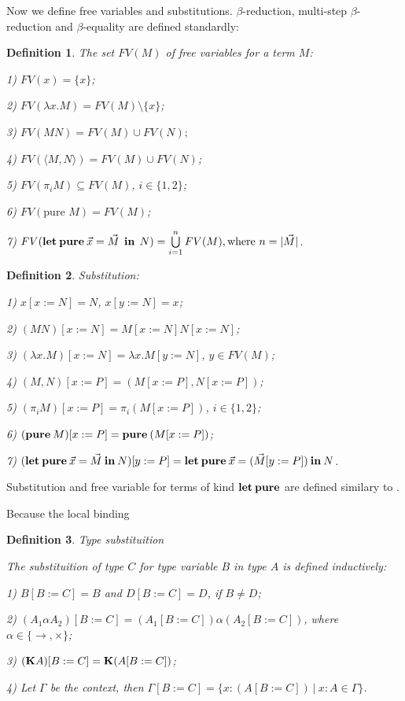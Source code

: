 \documentclass[a4paper]{article}
\newtheorem{defin}{Definition}
\begin{document}
  \vspace{\baselineskip}

  Now we define free variables and substitutions. $\beta$-reduction, multi-step $\beta$-reduction and $\beta$-equality are defined standardly:

  \begin{defin} The set $FV(M)$ of free variables for a term $M$:

  1) $FV(x) = \{ x \}$;

  2) $FV(\lambda x. M) = FV(M) \setminus \{ x\}$;

  3) $FV(M N) = FV(M) \cup FV(N);$

  4) $FV(\langle M,N \rangle) = FV(M) \cup FV(N)$;

  5) $FV(\pi_i M) \subseteq FV(M)$, $i \in \{ 1, 2\}$;

  6) $FV(\text{pure } M) = FV(M)$;

  7) $FV({\bf let \: pure} \: \vec{x} = \vec{M} \:\: {\bf in} \:\: N) = \bigcup \limits_{i = 1}^n FV(M), \text{where $n = |\vec{M}|$}$.
  \end{defin}

  \begin{defin} Substitution:

  1) $x [x := N] = N$, $x [y := N] = x$;

  2) $(M N) [x := N] = M[x := N] N [x := N]$;

  3) $(\lambda x. M) [x := N] = \lambda x. M [y := N]$, $y \in FV(M)$;

  4) $(M, N)[x := P] = (M[x := P], N [x := P])$;

  5) $(\pi_i M) [x := P] = \pi_i (M[x := P])$, $i \in \{ 1, 2\}$;

  6) $({\bf pure \: } M) [x := P] = {\bf pure \: } (M [x := P])$;

  7) $({\bf let \: pure \:}\vec{x} = \vec{M} {\: \bf in \:} N) [y := P] = {\bf let \: pure \:} \vec{x} = (\vec{M} [y := P]) {\: \bf in \:} N$.
  \end{defin}

Substitution and free variable for terms of kind ${\bf let \: pure}$ are defined similary to \cite{ModalK}.

Because the local binding




  \begin{defin} Type substituition

    The substituition of type $C$ for type variable $B$ in type $A$ is defined inductively:

    1) $B [B := C] = B$ and $D [B := C] = D$, if $B \neq D$;

    2) $(A_1 \alpha A_2)[B := C] = (A_1[B := C]) \alpha (A_2[B := C])$, where $\alpha \in \{ \to, \times \}$;

    3) $({\bf K}A)[B := C] = {\bf K}(A [B := C])$;

    4) Let $\Gamma$ be the context, then $\Gamma [B := C] = \{ x : (A[B := C]) \: | \: x : A \in \Gamma \}$.
  \end{defin}
\end{document}
